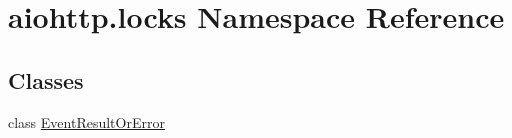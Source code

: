 \hypertarget{namespaceaiohttp_1_1locks}{}\section{aiohttp.\+locks Namespace Reference}
\label{namespaceaiohttp_1_1locks}
\subsection*{Classes}
\begin{DoxyCompactItemize}
\item 
class \hyperlink{classaiohttp_1_1locks_1_1_event_result_or_error}{Event\+Result\+Or\+Error}
\end{DoxyCompactItemize}
